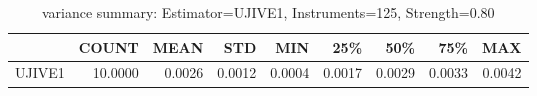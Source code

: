 \begin{table}[ht]
\centering
\caption{variance summary: Estimator=UJIVE1, Instruments=125, Strength=0.80}
\begin{tabular}{lrrrrrrrr}
\toprule
 & COUNT & MEAN & STD & MIN & 25\% & 50\% & 75\% & MAX \\
\midrule
UJIVE1 & 10.0000 & 0.0026 & 0.0012 & 0.0004 & 0.0017 & 0.0029 & 0.0033 & 0.0042 \\
\bottomrule
\end{tabular}
\end{table}

